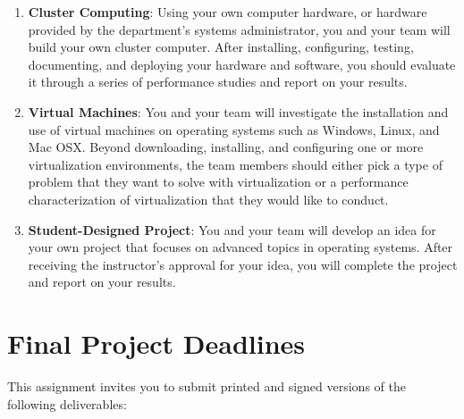 \begin{enumerate}
  \item {\bf Cluster Computing}: Using your own computer hardware, or hardware provided by the department's systems
    administrator, you and your team will build your own cluster computer.  After installing, configuring, testing,
    documenting, and deploying your hardware and software, you should evaluate it through a series of performance
    studies and report on your results.

  \item {\bf Virtual Machines}: You and your team will investigate the installation and use of virtual machines on
    operating systems such as Windows, Linux, and Mac OSX.  Beyond downloading, installing, and configuring one or more
    virtualization environments, the team members should either pick a type of problem that they want to solve with
    virtualization or a performance characterization of virtualization that they would like to conduct.

  \item {\bf Student-Designed Project}: You and your team will develop an idea for your own project that focuses on
    advanced topics in operating systems. After receiving the instructor's approval for your idea, you will complete the
    project and report on your results.

\end{enumerate}



\section*{Final Project Deadlines}

This assignment invites you to submit printed and signed versions of the following deliverables:

